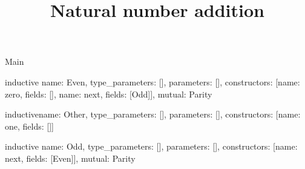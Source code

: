 \begin{lexlean}{Main}
\title{Natural number addition}
\begin{semanticmodule}
inductive{
  name: Even,
  type_parameters: [],
  parameters: [],
  constructors: [{name: zero, fields: []}, {name: next, fields: [Odd]}],
  mutual: Parity
}

inductive{name: Other, type_parameters: [], parameters: [], constructors: [{name: one, fields: []}]}

inductive{
  name: Odd,
  type_parameters: [],
  parameters: [],
  constructors: [{name: next, fields: [Even]}],
  mutual: Parity
}
\end{semanticmodule}
\end{lexlean}
